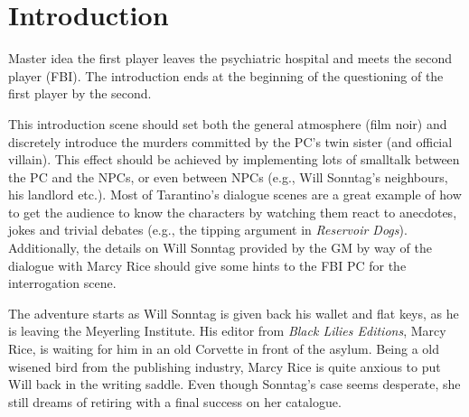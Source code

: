 \section{Introduction}

Master idea
the first player leaves the psychiatric hospital and meets the second player
(FBI). The introduction ends at the beginning of the questioning of the first
player by the second.

\begin{leading_idea}
This introduction scene should set both the general atmosphere (film noir) and
discretely introduce the murders committed by the PC's twin sister (and
official villain). This effect should be achieved by implementing lots of
smalltalk between the PC and the NPCs, or even between NPCs (e.g., Will
Sonntag's neighbours, his landlord etc.). Most of Tarantino's dialogue scenes
are a great example of how to get the audience to know the characters by
watching them react to anecdotes, jokes and trivial debates (e.g., the tipping
argument in \emph{Reservoir Dogs}). Additionally, the details on Will Sonntag
provided by the GM by way of the dialogue with Marcy Rice should give some
hints to the FBI PC for the interrogation scene.
\end{leading_idea}

The adventure starts as Will Sonntag is given back his wallet and flat keys, as
he is leaving the Meyerling Institute. His editor from \emph{Black Lilies
Editions}, Marcy Rice, is waiting for him in an old Corvette in front of the
asylum. Being a old wisened bird from the publishing industry, Marcy Rice is
quite anxious to put Will back in the writing saddle. Even though Sonntag's
case seems desperate, she still dreams of retiring with a final success on her
catalogue.

